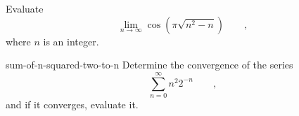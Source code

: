 \begin{hwsection}
\begin{hw}[2]
Evaluate
\begin{equation*}
  \lim_{n\rightarrow\infty} \cos(\pi\sqrt{n^2-n}) \qquad ,
\end{equation*}
where $n$ is an integer.
\end{hw}

\begin{hwwithsoln}[2]{sum-of-n-squared-two-to-n}
Determine the convergence of the series
\begin{equation*}
  \sum_{n=0}^{\infty} n^2 2^{-n} \qquad ,
\end{equation*}
and if it converges, evaluate it.
\end{hwwithsoln}



\end{hwsection}
